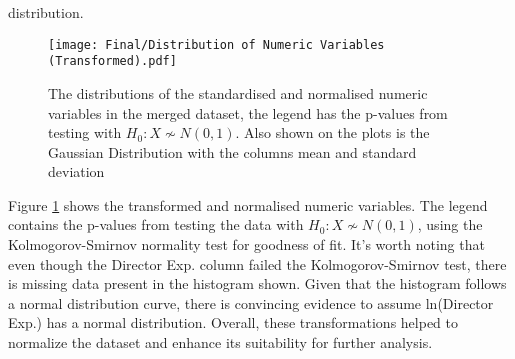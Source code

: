             distribution.
        \begin{figure}[H]
            \centering
            \texttt{[image: Final/Distribution of Numeric Variables (Transformed).pdf]}
            \caption[short]{The distributions of the standardised and normalised numeric variables in the merged dataset,
                            the legend has the p-values from testing with $H_{0}: X \not\sim N(0,1)$. Also shown on the plots is
                            the Gaussian Distribution with the columns mean and standard deviation}\label{fig-transformed-distribution-of-numeric-variable}
        \end{figure}
        Figure \ref*{fig-transformed-distribution-of-numeric-variable} shows the transformed and normalised numeric variables.
        The legend contains the p-values from testing the data with $H_{0}: X \not\sim N(0,1)$, using the Kolmogorov-Smirnov normality
            test\cite*{KStest} for goodness of fit.
        It's worth noting that even though the Director Exp. column failed the Kolmogorov-Smirnov test, there is missing data present in the histogram shown.
        Given that the histogram follows a normal distribution curve, there is convincing evidence to assume ln(Director Exp.) has a normal distribution.
        Overall, these transformations helped to normalize the dataset and enhance its suitability for further analysis.